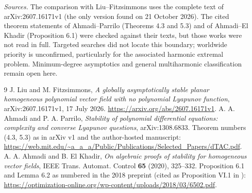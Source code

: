 \documentclass[11pt]{article}
\theoremstyle{remark}\newtheorem{remark}[theorem]{Remark}
\begin{document}
\emph{Sources.} The comparison with Liu--Fitzsimmons uses the complete
text of arXiv:2607.16171v1 (the only version found on 21 October 2026).
The cited theorem statements of Ahmadi--Parrilo (Theorems 4.3 and 5.3) and
of Ahmadi--El Khadir (Proposition 6.1) were checked against their
texts, but those works were not read in full. Targeted searches did not locate this
boundary; worldwide priority is unconfirmed, particularly for the
associated harmonic extremal problem. Minimum-degree asymptotics and
general multiharmonic classification remain open here.

\small
\begin{thebibliography}{9}
J. Liu and M. Fitzsimmons,
\emph{A globally asymptotically stable planar homogeneous polynomial
vector field with no polynomial Lyapunov function},
arXiv:2607.16171v1, 17 July 2026.
\url{https://arxiv.org/abs/2607.16171v1}.
A. A. Ahmadi and P. A. Parrilo,
\emph{Stability of polynomial differential equations:
complexity and converse Lyapunov questions}, arXiv:1308.6833.
Theorem numbers (4.3, 5.3) as in arXiv v1 and the author-hosted manuscript:
\url{https://web.mit.edu/~a_a_a/Public/Publications/Selected_Papers/dTAC.pdf}.
A. A. Ahmadi and B. El Khadir,
\emph{On algebraic proofs of stability for homogeneous vector fields},
IEEE Trans. Automat. Control \textbf{65} (2020), 325--332.
Proposition 6.1 and Lemma 6.2 as numbered in the 2018 preprint
(cited as Proposition VI.1 in \cite{liu}):
\url{https://optimization-online.org/wp-content/uploads/2018/03/6502.pdf}.
\end{thebibliography}
\end{document}
